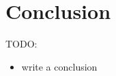 \documentclass[licencjacka,en]{pracamgr}
\begin{document}
\chapter{Conclusion}\label{r:chapter_conclusion}

TODO:
\begin{itemize}
	\item write a conclusion
\end{itemize}



\appendix

\begin{thebibliography}{99}\label{r:chapter_bibliography}


\end{thebibliography}
\end{document}

